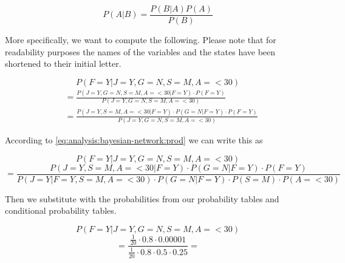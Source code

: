 \begin{equation}
P(A|B) = \frac{P(B|A)P(A)}{P(B)}
\end{equation}

More specifically, we want to compute the following. Please note that for readability purposes the names of the variables and the states have been shortened to their initial letter.

\begin{equation*}
P(F=Y|J = Y, G = N, S = M, A = < 30) 
\end{equation*}
\begin{equation*}
\begin{split}
&= \frac{P(J = Y, G = N, S = M, A = < 30|F=Y) \cdot P(F=Y)}{P(J = Y, G = N, S = M, A = < 30)} \\
&= \frac{P(J = Y, S = M, A = < 30|F=Y) \cdot P(G=N|F=Y) \cdot P(F=Y)}{P(J = Y, G = N, S = M, A = < 30)}
\end{split}
\end{equation*}

According to \cref{eq:analysis:bayesian-network:prod} we can write this as

\begin{equation*}
P(F=Y|J = Y, G = N, S = M, A = < 30) 
\end{equation*}
\begin{equation*}
= \frac{P(J = Y, S = M, A = < 30|F=Y) \cdot P(G=N|F=Y) \cdot P(F=Y)}{P(J=Y|F=Y,S=M,A=<30) \cdot P(G=N|F=Y) \cdot P(S=M) \cdot P(A=<30)}
\end{equation*}

Then we substitute with the probabilities from our probability tables and conditional probability tables.

\begin{equation*}
P(F=Y|J = Y, G = N, S = M, A = < 30) 
\end{equation*}
\begin{equation*}
= \frac{\frac{1}{20} \cdot 0.8 \cdot 0.00001}{\frac{1}{20} \cdot 0.8 \cdot 0.5 \cdot 0.25} = 
\end{equation*}
